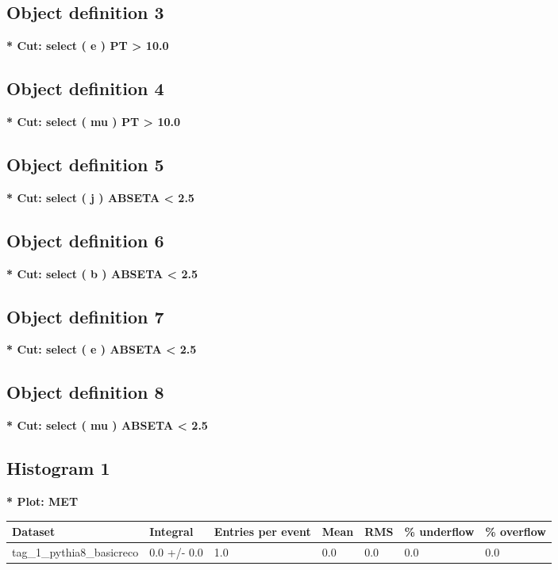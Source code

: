 \documentclass[a4paper, 10pt]{article}
\begin{document}
   \subsection{ Object definition 3}

\textbf{* Cut: select ( e ) PT > 10.0}\\
   \subsection{ Object definition 4}

\textbf{* Cut: select ( mu ) PT > 10.0}\\
   \subsection{ Object definition 5}

\textbf{* Cut: select ( j ) ABSETA < 2.5}\\
   \subsection{ Object definition 6}

\textbf{* Cut: select ( b ) ABSETA < 2.5}\\
   \subsection{ Object definition 7}

\textbf{* Cut: select ( e ) ABSETA < 2.5}\\
   \subsection{ Object definition 8}

\textbf{* Cut: select ( mu ) ABSETA < 2.5}\\
   \subsection{ Histogram 1}

\textbf{* Plot: MET}\\
   \begin{table}[H]
  \begin{center}
    \begin{tabular}{|m{23.0mm}|m{23.0mm}|m{18.0mm}|m{19.0mm}|m{19.0mm}|m{19.0mm}|m{19.0mm}|}
      \hline
      {\cellcolor{yellow}         Dataset}& {\cellcolor{yellow}         Integral}& {\cellcolor{yellow}         Entries per event}& {\cellcolor{yellow}         Mean}& {\cellcolor{yellow}         RMS}& {\cellcolor{yellow}         \% underflow}& {\cellcolor{yellow}         \% overflow}\\
      \hline
      {\cellcolor{white}         tag\_1\_pythia8\_basicreco}& {\cellcolor{white}         0.0 +/\-- 0.0}& {\cellcolor{white}         1.0}& {\cellcolor{white}         0.0}& {\cellcolor{white}         0.0}& {\cellcolor{green}         0.0}& {\cellcolor{green}         0.0}\\
\hline
    \end{tabular}
  \end{center}
\end{table}
\end{document}
